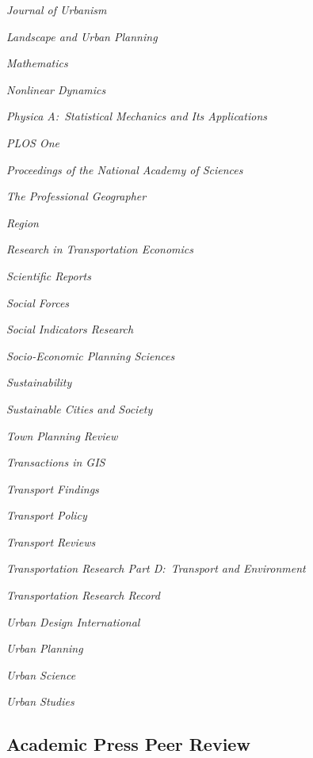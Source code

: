 \documentclass[11pt,letterpaper]{report}
\newcommand{\listitemspace}{0.25em}
\renewenvironment{itemize}
{\begin{list}{}{\setlength{\leftmargin}{0em}
                \setlength{\parskip}{0em}
                \setlength{\itemsep}{\listitemspace}
                \setlength{\parsep}{\listitemspace}}}
{\end{list}}
\begin{document}
\begin{itemize}
        \item \textit{Journal of Urbanism}
        \item \textit{Landscape and Urban Planning}
        \item \textit{Mathematics}
        \item \textit{Nonlinear Dynamics}
        \item \textit{Physica A:\ Statistical Mechanics and Its Applications}
        \item \textit{PLOS One}
        \item \textit{Proceedings of the National Academy of Sciences}
        \item \textit{The Professional Geographer}
        \item \textit{Region}
        \item \textit{Research in Transportation Economics}
        \item \textit{Scientific Reports}
        \item \textit{Social Forces}
        \item \textit{Social Indicators Research}
        \item \textit{Socio-Economic Planning Sciences}
        \item \textit{Sustainability}
        \item \textit{Sustainable Cities and Society}
        \item \textit{Town Planning Review}
        \item \textit{Transactions in GIS}
        \item \textit{Transport Findings}
        \item \textit{Transport Policy}
        \item \textit{Transport Reviews}
        \item \textit{Transportation Research Part D:\ Transport and Environment}
        \item \textit{Transportation Research Record}
        \item \textit{Urban Design International}
        \item \textit{Urban Planning}
        \item \textit{Urban Science}
        \item \textit{Urban Studies}

    \end{itemize}

    \subsection*{Academic Press Peer Review}
\end{document}
